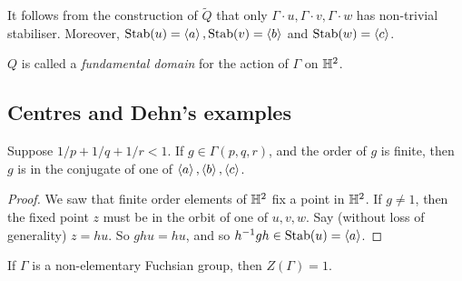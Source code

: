 \documentclass{article}
\begin{document}
\begin{remark}
    It follows from the construction of \(\widetilde Q\) that only \(\Gamma \cdot u, \Gamma \cdot v, \Gamma \cdot w\) has non-trivial stabiliser. Moreover, \(\operatorname{Stab}(u) = \left\langle a \right\rangle, \operatorname{Stab}(v) = \left\langle b \right\rangle\) and \(\operatorname{Stab}(w) = \left\langle c \right\rangle\).

    \(Q\) is called a \emph{fundamental domain} for the action of \(\Gamma\) on \(\mathbb{H}^2\).
\end{remark}

\subsection{Centres and Dehn's examples}

\begin{lemma}
    Suppose \(1/p + 1/q + 1/r < 1\). If \(g \in \Gamma(p, q, r)\), and the order of \(g\) is finite, then \(g\) is in the conjugate of one of \(\left\langle a \right\rangle, \left\langle b \right\rangle, \left\langle c \right\rangle\).
\end{lemma}

\begin{proof}
    We saw that finite order elements of \(\mathbb{H}^2\) fix a point in \(\mathbb{H}^2\). If \(g \ne 1\), then the fixed point \(z\) must be in the orbit of one of \(u, v, w\). Say (without loss of generality) \(z = hu\). So \(ghu = hu\), and so \(h^{-1}gh \in \operatorname{Stab}(u) = \left\langle a \right\rangle\).
\end{proof}

\begin{proposition}
    If \(\Gamma\) is a non-elementary Fuchsian group, then \(Z(\Gamma) = 1\).
\end{proposition}
\end{document}
